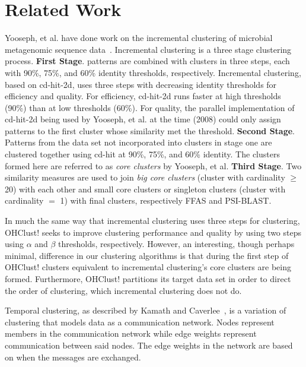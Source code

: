 \documentclass[12pt]{ucthesis}
\begin{document}
\chapter{Related Work}\label{chap:related}
   Yooseph, et al. have done work on the incremental clustering of microbial
   metagenomic sequence data~\cite{Yooseph:Incremental}. Incremental clustering
   is a three stage clustering process. \textbf{First Stage}. patterns are
   combined with clusters in three steps, each with 90\%, 75\%, and 60\%
   identity thresholds, respectively. Incremental clustering, based on
   cd-hit-2d, uses three steps with decreasing identity thresholds for
   efficiency and quality. For efficiency, cd-hit-2d runs faster
   at high thresholds (90\%) than at low thresholds (60\%). For quality, the
   parallel implementation of cd-hit-2d being used by Yooseph, et al. at the time
   (2008) could only assign patterns to the first cluster whose similarity met
   the threshold. \textbf{Second Stage}. Patterns from the data set not
   incorporated into clusters in stage one are clustered together using cd-hit
   at 90\%, 75\%, and 60\% identity. The clusters formed here are referred to
   as \textit{core clusters} by Yooseph, et al. \textbf{Third Stage}. Two similarity
   measures are used to join \textit{big core clusters} (cluster with
   cardinality $\ge$ 20) with each other and small core clusters or singleton
   clusters (cluster with cardinality $=$ 1) with final clusters, respectively
   FFAS and PSI-BLAST.

   In much the same way that incremental clustering uses three steps for
   clustering, OHClust! seeks to improve clustering performance and
   quality by using two steps using $\alpha$ and $\beta$ thresholds,
   respectively. However, an interesting, though perhaps minimal, difference in
   our clustering algorithms is that during the first step of OHClust!
   clusters equivalent to incremental clustering's core clusters are being formed.
   Furthermore, OHClust! partitions its target data set in order to direct the
   order of clustering, which incremental clustering does not do.

   Temporal clustering, as described by Kamath and
   Caverlee~\cite{Kamath:Transient}, is a variation of clustering that models
   data as a communication network. Nodes represent members in the
   communication network while edge weights represent communication between
   said nodes. The edge weights in the network are based on when the messages
   are exchanged.
\end{document}
